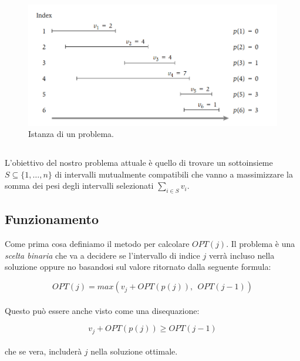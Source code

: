 \begin{figure}[H]
    \centering
    \includegraphics[width=12cm, keepaspectratio]{capitoli/dynamic_programming/imgs/weighted_problem.png}
    \caption{Istanza di un problema.}
\end{figure}

\subsection{\goal}

L'obiettivo del nostro problema attuale è quello di trovare un sottoinsieme $S
    \subseteq \{1, \ldots, n\}$ di intervalli mutualmente compatibili che vanno a
massimizzare la somma dei pesi degli intervalli selezionati $\sum_{i \in S}
    v_i$.

\subsection{Funzionamento}

Come prima cosa definiamo il metodo per calcolare $OPT(j)$. Il problema è
una \textit{scelta binaria} che va a decidere se l'intervallo di indice $j$
verrà incluso nella soluzione oppure no basandosi sul valore ritornato dalla
seguente formula:

\begin{equation}
    \label{eqn:weight-opt}
    OPT(j) = max(v_j + OPT(p(j)), \ \ OPT(j-1))
\end{equation}
\ \\
Questo può essere anche visto come una disequazione:

\begin{equation}
    \label{eqn:weight-opt-dis}
    v_j + OPT(p(j)) \geq OPT(j-1)
\end{equation}
\ \\
che se vera, includerà $j$ nella soluzione ottimale.

\pagebreak

